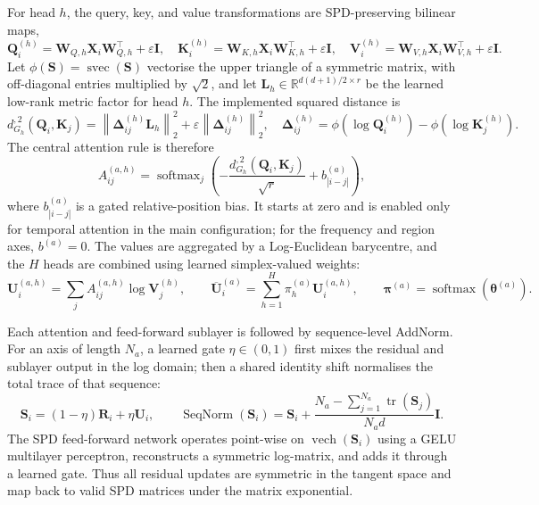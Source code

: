 For head $h$, the query, key, and value transformations are SPD-preserving
bilinear maps,
\begin{equation}
    \bm Q_i^{(h)}=\bm W_{Q,h}\bm X_i\bm W_{Q,h}^{\top}+\varepsilon\bm I,
    \quad
    \bm K_i^{(h)}=\bm W_{K,h}\bm X_i\bm W_{K,h}^{\top}+\varepsilon\bm I,
    \quad
    \bm V_i^{(h)}=\bm W_{V,h}\bm X_i\bm W_{V,h}^{\top}+\varepsilon\bm I.
    \label{eq:overview-qkv}
\end{equation}
Let $\phi(\bm S)=\operatorname{svec}(\bm S)$ vectorise the upper triangle of a
symmetric matrix, with off-diagonal entries multiplied by $\sqrt{2}$, and let
$\bm L_h\in\mathbb R^{d(d+1)/2\times r}$ be the learned low-rank metric factor
for head $h$.  The implemented squared distance is
\begin{equation}
    d_{G_h}^{,2}(\bm Q_i,\bm K_j)
    =\left\|\bm\Delta_{ij}^{(h)}\bm L_h\right\|_2^2
     +\varepsilon\left\|\bm\Delta_{ij}^{(h)}\right\|_2^2,
    \quad
    \bm\Delta_{ij}^{(h)}
    =\phi(\log\bm Q_i^{(h)})-\phi(\log\bm K_j^{(h)}).
    \label{eq:overview-riemannian-distance}
\end{equation}
The central attention rule is therefore
\begin{equation}
    A_{ij}^{(a,h)}
    =\operatorname{softmax}_{j}\!\left(
       -\frac{d_{G_h}^{,2}(\bm Q_i,\bm K_j)}{\sqrt r}
       +b_{|i-j|}^{(a)}
     \right),
    \label{eq:overview-attention}
\end{equation}
where $b_{|i-j|}^{(a)}$ is a gated relative-position bias.  It starts at zero
and is enabled only for temporal attention in the main configuration; for the
frequency and region axes, $b^{(a)}=0$.  The values are aggregated by a
Log-Euclidean barycentre, and the $H$ heads are combined using learned
simplex-valued weights:
\begin{equation}
    \bm U_i^{(a,h)}=\sum_j A_{ij}^{(a,h)}\log\bm V_j^{(h)},
    \qquad
    \overline{\bm U}_i^{(a)}=\sum_{h=1}^{H}\pi_h^{(a)}\bm U_i^{(a,h)},
    \qquad
    \bm\pi^{(a)}=\operatorname{softmax}(\bm\theta^{(a)}).
    \label{eq:overview-head-fusion}
\end{equation}

Each attention and feed-forward sublayer is followed by sequence-level
AddNorm.  For an axis of length $N_a$, a learned gate
$\eta\in(0,1)$ first mixes the residual and sublayer output in the log domain;
then a shared identity shift normalises the total trace of that sequence:
\begin{equation}
    \bm S_i=(1-\eta)\bm R_i+\eta\bm U_i,
    \qquad
    \operatorname{SeqNorm}(\bm S_i)
    =\bm S_i+
      \frac{N_a-\sum_{j=1}^{N_a}\operatorname{tr}(\bm S_j)}{N_a d}\bm I.
    \label{eq:overview-sequence-norm}
\end{equation}
The SPD feed-forward network operates point-wise on
$\operatorname{vech}(\bm S_i)$ using a GELU multilayer perceptron, reconstructs
a symmetric log-matrix, and adds it through a learned gate.  Thus all residual
updates are symmetric in the tangent space and map back to valid SPD matrices
under the matrix exponential.

